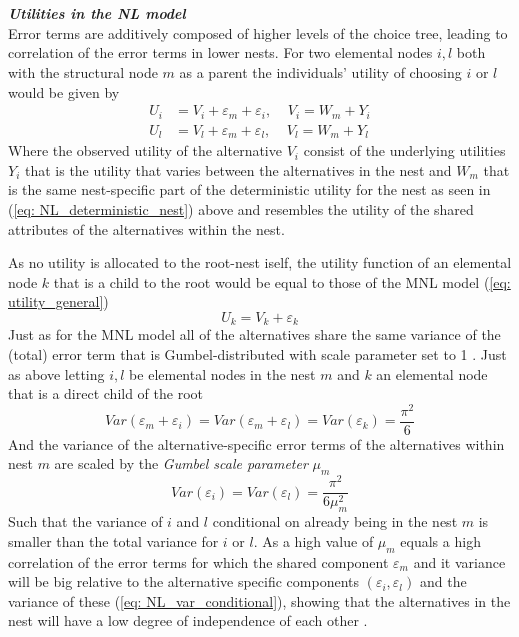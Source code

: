 \\ \\
\textbf{\textit{Utilities in the NL model}} \\
Error terms are additively composed of higher levels of the choice tree, leading to correlation of the error terms in lower nests. For two elemental nodes $i,l$ both with the structural node $m$ as a parent the individuals' utility of choosing $i$ or $l$ would be given by \citep{train_discrete_2009}
  \begin{equation} \label{eq: utility_NL_nested}
  \begin{split}
    U_{i} &= V_{i} + \varepsilon_{m} + \varepsilon_{i},\ \ \ \ \ V_{i} = W_{m} + Y_{i} \\
    U_{l} &= V_{l} + \varepsilon_{m} + \varepsilon_{l},\ \ \ \ \ V_{l} = W_{m} + Y_{l}
  \end{split}
  \end{equation}
Where the observed utility of the alternative $V_i$ consist of the underlying utilities $Y_i$ that is the utility that varies between the alternatives in the nest and $W_{m}$ that is the same nest-specific part of the deterministic utility for the nest as seen in (\ref{eq: NL_deterministic_nest}) above and resembles the utility of the shared attributes of the alternatives within the nest.

As no utility is allocated to the root-nest iself, the utility function of an elemental node $k$ that is a child to the root would be equal to those of the MNL model (\ref{eq: utility_general})
  \begin{equation} \label{eq: utility_NL_unnested}
    U_{k} = V_{k} + \varepsilon_{k}
  \end{equation}
Just as for the MNL model all of the alternatives share the same variance of the (total) error term that is Gumbel-distributed with scale parameter set to 1 \citep{koppelman_self_2006}. Just as above letting $i,l$ be elemental nodes in the nest $m$ and $k$ an elemental node that is a direct child of the root
\begin{equation} \label{eq: NL_var}
    Var(\varepsilon_{m} + \varepsilon_{i})=
    Var(\varepsilon_{m} +\varepsilon_{l})
    =Var(\varepsilon_{k})
    =\frac{\pi^2}{6}
\end{equation}
And the variance of the alternative-specific error terms of the alternatives within nest $m$ are scaled by the \textit{Gumbel scale parameter} $\mu_{m}$
\begin{equation} \label{eq: NL_var_conditional}
    Var(\varepsilon_{i})=Var(\varepsilon_{l})
    =\frac{\pi^2}{6\mu_{m}^2}
\end{equation}
Such that the variance of $i$ and $l$ conditional on already being in the nest $m$ is smaller than the total variance for $i$ or $l$. As a high value of $\mu_{m}$ equals a high correlation of the error terms for which the shared component $\varepsilon_{m}$ and it variance will be big relative to the alternative specific components $(\varepsilon_{i},\varepsilon_{l})$ and the variance of these (\ref{eq: NL_var_conditional}), showing that the alternatives in the nest will have a low degree of independence of each other \citep{koppelman_self_2006}.

